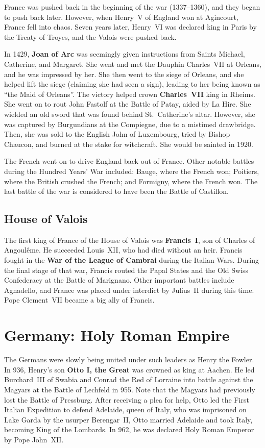 France was pushed back in the beginning of the war (1337--1360), and they began to push back later.
However, when Henry~V of England won at Agincourt, France fell into chaos.
Seven years later, Henry~VI was declared king in Paris by the Treaty of Troyes,
and the Valois were pushed back.

In 1429, \textbf{Joan of Arc} was seemingly given instructions
from Saints Michael, Catherine, and Margaret.
She went and met the Dauphin Charles~VII at Orleans, and he was impressed by her.
She then went to the siege of Orleans, and she helped lift the siege (claiming she had seen a sign),
leading to her being known as ``the Maid of Orleans''.
The victory helped crown \textbf{Charles~VII} king in Rheims.
She went on to rout John Fastolf at the Battle of Patay, aided by La Hire.
She wielded an old sword that was found behind St.\ Catherine's altar.
However, she was captured by Burgundians at the Compiegne, due to a mistimed drawbridge.
Then, she was sold to the English John of Luxembourg,
tried by Bishop Chaucon, and burned at the stake for witchcraft.
She would be sainted in 1920.

The French went on to drive England back out of France.
Other notable battles during the Hundred Years' War included:
Bauge, where the French won;
Poitiers, where the British crushed the French;
and Formigny, where the French won.
The last battle of the war is considered to have been the Battle of Castillon.

\subsection*{House of Valois}

The first king of France of the House of Valois was \textbf{Francis~I},
son of Charles of Angoul\^eme.
He succeeded Louis~XII, who had died without an heir.
Francis fought in the \textbf{War of the League of Cambrai} during the Italian Wars.
During the final stage of that war, Francis routed the Papal States and the Old Swiss Confederacy
at the Battle of Marignano.
Other important battles include Agnadello,
and France was placed under interdict by Julius~II during this time.
Pope Clement~VII became a big ally of Francis.

\section{Germany: Holy Roman Empire}

The Germans were slowly being united under such leaders as Henry the Fowler.
In 936, Henry's son \textbf{Otto I, the Great} was crowned as king at Aachen.
He led Burchard~III of Swabia and Conrad the Red of Lorraine into battle
against the Magyars at the Battle of Lechfeld in 955.
Note that the Magyars had previously lost the Battle of Pressburg.
After receiving a plea for help,
Otto led the First Italian Expedition to defend Adelaide, queen of Italy,
who was imprisoned on Lake Garda by the usurper Berengar~II,
Otto married Adelaide and took Italy, becoming King of the Lombards.
In 962, he was declared Holy Roman Emperor by Pope John~XII\@.

